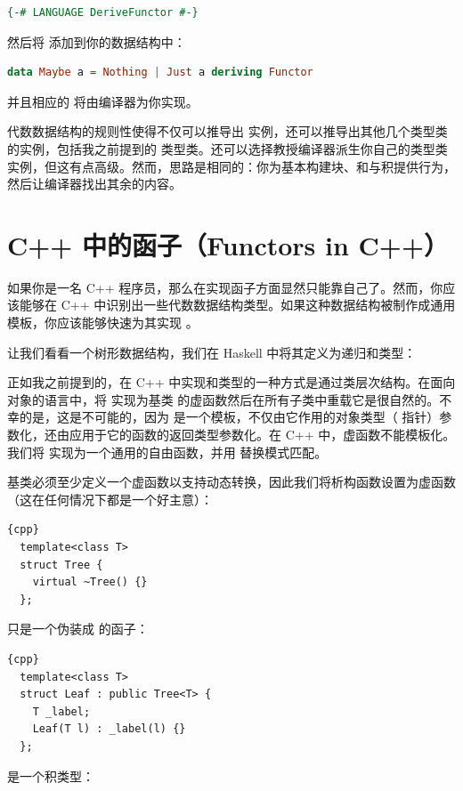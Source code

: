 \begin{lstlisting}[language=Haskell]
{-# LANGUAGE DeriveFunctor #-}
\end{lstlisting}
然后将  添加到你的数据结构中：

\begin{lstlisting}[language=Haskell]
  data Maybe a = Nothing | Just a deriving Functor
\end{lstlisting}
并且相应的  将由编译器为你实现。

代数数据结构的规则性使得不仅可以推导出  实例，还可以推导出其他几个类型类的实例，包括我之前提到的  类型类。还可以选择教授编译器派生你自己的类型类实例，但这有点高级。然而，思路是相同的：你为基本构建块、和与积提供行为，然后让编译器找出其余的内容。

\section{C++ 中的函子（Functors in C++）}

如果你是一名 C++ 程序员，那么在实现函子方面显然只能靠自己了。然而，你应该能够在 C++ 中识别出一些代数数据结构类型。如果这种数据结构被制作成通用模板，你应该能够快速为其实现 。

让我们看看一个树形数据结构，我们在 Haskell 中将其定义为递归和类型：

正如我之前提到的，在 C++ 中实现和类型的一种方式是通过类层次结构。在面向对象的语言中，将  实现为基类  的虚函数然后在所有子类中重载它是很自然的。不幸的是，这是不可能的，因为  是一个模板，不仅由它作用的对象类型（ 指针）参数化，还由应用于它的函数的返回类型参数化。在 C++ 中，虚函数不能模板化。我们将  实现为一个通用的自由函数，并用  替换模式匹配。

基类必须至少定义一个虚函数以支持动态转换，因此我们将析构函数设置为虚函数（这在任何情况下都是一个好主意）：

\begin{lstlisting}{cpp}
  template<class T>
  struct Tree {
    virtual ~Tree() {}
  };
\end{lstlisting}
 只是一个伪装成  的函子：

\begin{lstlisting}{cpp}
  template<class T>
  struct Leaf : public Tree<T> {
    T _label;
    Leaf(T l) : _label(l) {}
  };
\end{lstlisting}
 是一个积类型：

